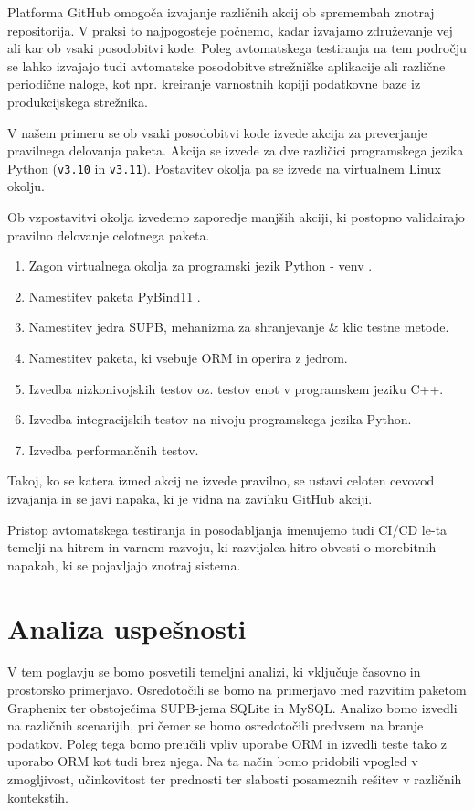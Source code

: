 \documentclass[a4paper,12pt,openright]{book}
\begin{document}
   Platforma GitHub omogoča izvajanje različnih akcij ob spremembah znotraj repositorija. V praksi to najpogosteje počnemo, kadar izvajamo združevanje vej ali kar ob vsaki posodobitvi kode. Poleg avtomatskega testiranja na tem področju se lahko izvajajo tudi avtomatske posodobitve strežniške aplikacije ali različne periodične naloge, kot npr. kreiranje varnostnih kopiji podatkovne baze iz produkcijskega strežnika.

   V našem primeru se ob vsaki posodobitvi kode izvede akcija za preverjanje pravilnega delovanja paketa. Akcija se izvede za dve različici programskega jezika Python ({\tt v3.10} in {\tt v3.11}). Postavitev okolja pa se izvede na virtualnem Linux okolju.

   Ob vzpostavitvi okolja izvedemo zaporedje manjših akciji, ki postopno validairajo pravilno delovanje celotnega paketa.
   \begin{enumerate}
       \item Zagon virtualnega okolja za programski jezik Python - venv \cite{wang2022smartpip}.
       \item Namestitev paketa PyBind11 \cite{PYBIND11_GITHUB}.
       \item Namestitev jedra SUPB, mehanizma za shranjevanje \& klic testne metode.
       \item Namestitev paketa, ki vsebuje ORM in operira z jedrom.
       \item Izvedba nizkonivojskih testov oz. testov enot v programskem jeziku C++.
       \item Izvedba integracijskih testov na nivoju programskega jezika Python.
       \item Izvedba performančnih testov.
   \end{enumerate}

    \noindent
   Takoj, ko se katera izmed akcij ne izvede pravilno, se ustavi celoten cevovod izvajanja in se javi napaka, ki je vidna na zavihku GitHub akciji.

   Pristop avtomatskega testiranja in posodabljanja imenujemo tudi CI/CD le-ta temelji na hitrem in varnem razvoju, ki razvijalca hitro obvesti o morebitnih napakah, ki se pojavljajo znotraj sistema.
    
\chapter{Analiza uspešnosti}
\label{ch2}

    V tem poglavju se bomo posvetili temeljni analizi, ki vključuje časovno in prostorsko primerjavo. Osredotočili se bomo na primerjavo med razvitim paketom Graphenix ter obstoječima SUPB-jema SQLite in MySQL. Analizo bomo izvedli na različnih scenarijih, pri čemer se bomo osredotočili predvsem na branje podatkov. Poleg tega bomo preučili vpliv uporabe ORM in izvedli teste tako z uporabo ORM kot tudi brez njega. Na ta način bomo pridobili vpogled v zmogljivost, učinkovitost ter prednosti ter slabosti posameznih rešitev v različnih kontekstih.
\end{document}

